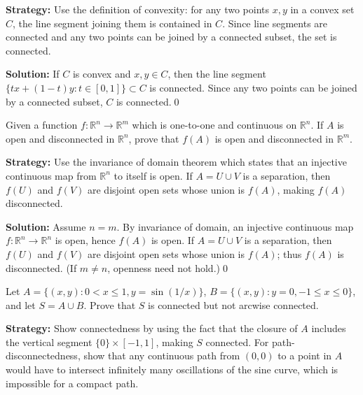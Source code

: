 \noindent\textbf{Strategy:} Use the definition of convexity: for any two points $x, y$ in a convex set $C$, the line segment joining them is contained in $C$. Since line segments are connected and any two points can be joined by a connected subset, the set is connected.

\bigskip\noindent\textbf{Solution:}
If $C$ is convex and $x,y\in C$, then the line segment $\{tx+(1-t)y: t\in[0,1]\}\subset C$ is connected. Since any two points can be joined by a connected subset, $C$ is connected.\qed



\begin{problembox}
Given a function $f : \mathbb{R}^n \to \mathbb{R}^m$ which is one-to-one and continuous on $\mathbb{R}^n$. If $A$ is open and disconnected in $\mathbb{R}^n$, prove that $f(A)$ is open and disconnected in $\mathbb{R}^m$.
\end{problembox}

\noindent\textbf{Strategy:} Use the invariance of domain theorem which states that an injective continuous map from $\mathbb{R}^n$ to itself is open. If $A = U \cup V$ is a separation, then $f(U)$ and $f(V)$ are disjoint open sets whose union is $f(A)$, making $f(A)$ disconnected.

\bigskip\noindent\textbf{Solution:}
Assume $n=m$. By invariance of domain, an injective continuous map $f:\mathbb{R}^n\to\mathbb{R}^n$ is open, hence $f(A)$ is open. If $A=U\cup V$ is a separation, then $f(U)$ and $f(V)$ are disjoint open sets whose union is $f(A)$; thus $f(A)$ is disconnected. (If $m\ne n$, openness need not hold.)\qed



\begin{problembox}
Let $A = \{(x, y) : 0 < x \leq 1, y = \sin(1/x)\}$, $B = \{(x, y) : y = 0, -1 \leq x \leq 0\}$, and let $S = A \cup B$. Prove that $S$ is connected but not arcwise connected.
\end{problembox}

\noindent\textbf{Strategy:} Show connectedness by using the fact that the closure of $A$ includes the vertical segment $\{0\} \times [-1,1]$, making $S$ connected. For path-disconnectedness, show that any continuous path from $(0,0)$ to a point in $A$ would have to intersect infinitely many oscillations of the sine curve, which is impossible for a compact path.


